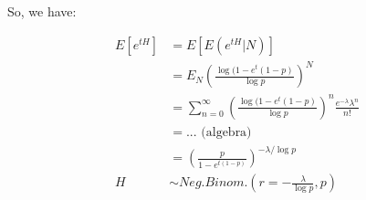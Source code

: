 \documentclass{article}
\begin{document}
So, we have:

\begin{equation*}
    \begin{split}
        E[e^{tH}] &= E[E(e^{tH}|N)]\\
            &= E_N\left(\frac{\log(1-e^t(1-p)}{\log p} \right)^N\\
            &= \sum_{n=0}^\infty \left(\frac{\log(1-e^t(1-p)}{\log p} \right)^n \frac{e^{-\lambda} \lambda^n}{n!}\\
            &= ... \text{ (algebra)}\\
            &= \left(\frac{p}{1-e^{t(1-p)}} \right)^{-\lambda/\log p}\\
        H &\sim Neg. Binom.\left(r = -\frac{\lambda}{\log p}, p\right)
    \end{split}
\end{equation*}
\end{document}
